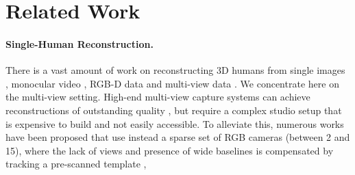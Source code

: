 \section{Related Work}
\label{sec:relat}



\paragraph{Single-Human Reconstruction.} 
There is a vast amount of work on reconstructing 3D humans from single images \cite{bogo2016keep, choutas2020monocular, kanazawa2018end,muller2021self,liu2022recent}, monocular video \cite{yuan2022glamr, Kocabas20, alldieck2018video}, RGB-D data \cite{yu2017bodyfusion,yu2018doublefusion,burov2021dynamic} and multi-view data \cite{starck2007surface,collet2015high,guo2019relightables,huang2018deep}. We concentrate here on the multi-view setting. %
High-end multi-view capture systems can achieve reconstructions of outstanding quality \cite{leroy2018shape, dou2016fusion4d, guo2019relightables, collet2015high,vlasic2009dynamic,Joo_2017_TPAMI}, but require a complex studio setup that is expensive to build and not easily accessible.
To alleviate this, numerous works have been proposed that use instead a sparse set of RGB cameras (\eg between 2 and 15), 
where the lack of views and presence of wide baselines is compensated by tracking a pre-scanned template \cite{gall2009motion, vlasic2008articulated, carranza2003free, de2008performance, wu2012full},
